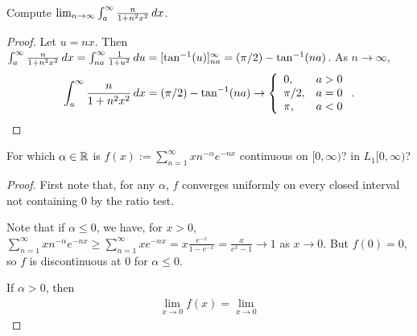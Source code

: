 \documentclass{article}
\begin{document}
 Compute $\lim_{n\to\infty} \int_a^\infty \frac{n}{1+n^2x^2} \,dx$.
\begin{proof}
Let $u = nx$. Then $\int_a^\infty \frac{n}{1+n^2x^2} \,dx = \int_{na}^\infty \frac{1}{1+u^2} \,du 
= [\tan^{-1}(u)]_{na}^\infty = (\pi/2) - \tan^{-1}(na)$. As $n\to\infty$, 
$$\int_a^\infty \frac{n}{1+n^2x^2} \,dx = (\pi/2) - \tan^{-1}(na) \to \left\{ 
\begin{array}{lr}
       0, &  a > 0\\
       \pi/2, & a = 0\\
       \pi, & a < 0
     \end{array}
\right. .$$
\end{proof}
 For which $\alpha \in \mathbb{R}$ is $f(x) := \sum_{n=1}^\infty xn^{-\alpha} e^{-nx}$ continuous on $[0,\infty)$? in $L_1[0,\infty)$?
\begin{proof}
First note that, for any $\alpha$, $f$ converges uniformly on every closed interval not containing $0$ by the ratio test.

Note that if $\alpha \le 0$, we have, for $x>0$,
$\sum_{n=1}^\infty xn^{-\alpha} e^{-nx} \ge \sum_{n=1}^\infty x e^{-nx} = x \frac{e^{-x}}{1 - e^{-x}}  = \frac x {e^x - 1} \to 1$
as $x \to 0$. But $f(0) = 0$, so $f$ is discontinuous at $0$ for $\alpha \le 0$.

If $\alpha > 0$, then 
\begin{align*}
\lim_{x\to 0} f(x) = \lim_{x\to 0}
\end{align*}
\end{proof}
\end{document}
